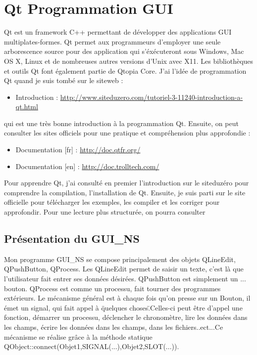 \documentclass{book}
\begin{document}
\chapter{Qt Programmation GUI}
Qt est un framework C++ permettant de développer des applications GUI multiplates-formes. Qt permet aux programmeurs d'employer une seule arborescence source pour des application qui s'éxécuteront sous Windows, Mac OS X, Linux et de nombreuses autres versions d'Unix avec X11. Les bibliothèques et outils Qt font également partie de Qtopia Core. J'ai l'idée de programmation Qt quand je suis tombé sur le siteweb :
\begin{itemize}
 \item Introduction : \href{http://www.siteduzero.com/tutoriel-3-11240-introduction-a-qt.html}{http://www.siteduzero.com/tutoriel-3-11240-introduction-a-qt.html}
\end{itemize}
qui est une très bonne introduction à la programmation Qt. Ensuite, on peut consulter les sites officiels pour une pratique et compréhension plus approfondie :
\begin{itemize}
 \item Documentation [fr] : \href{http://doc.qtfr.org/}{http://doc.qtfr.org/}
 \item Documentation [en] : \href{http://doc.trolltech.com/}{http://doc.trolltech.com/}
\end{itemize}
Pour apprendre Qt, j'ai consulté en premier l'introduction sur le siteduzéro pour comprendre la compilation, l'installation de Qt. Ensuite, je suis parti sur le site officielle pour télécharger les exemples, les compiler et les corriger pour approfondir. Pour une lecture plus structurée, on pourra consulter \cite{NCT7}
\section{Présentation du GUI\_NS}
Mon programme GUI\_NS se compose principalement des objets QLineEdit, QPushButton, QProcess. Les QLineEdit permet de saisir un texte, c'est là que l'utilisateur fait entrer ses données désirées. QPushButton est simplement un ... bouton. QProcess est comme un processu, fait tourner des programmes extérieurs. Le mécanisme général est à chaque fois qu'on presse sur un Bouton, il émet un signal, qui fait appel à \"quelques choses\".Celles-ci peut être d'appel une fonction, démarrer un processu, déclencher le chronomètre, lire les données dans les champs, écrire les données dans les champs, dans les fichiers..ect...Ce mécanisme se réalise grâce à la méthode statique  QObject::connect(Objet1,SIGNAL(...),Objet2,SLOT(...)). 
\end{document}
